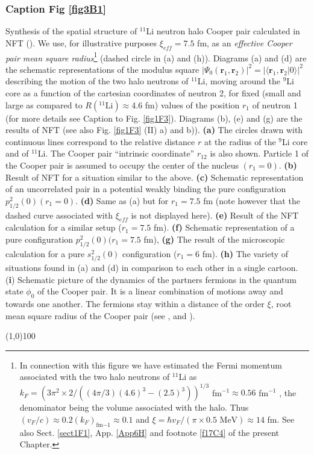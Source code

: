 \subsubsection{Caption Fig \ref{fig3B1}}
         Synthesis of the spatial structure of $^{11}$Li neutron halo Cooper pair calculated in NFT (\cite{Barranco:01}). We use, for illustrative purposes $\xi_{eff}=7.5$ fm, as an \textit{effective Cooper pair mean square radius}\footnote{In connection with this figure we have estimated the Fermi momentum associated with the two
halo neutrons of $^{11}$Li as $k_F= (3\pi^2 \times 2/((4\pi/3)(4.6)^3- (2.5)^3))^{1/3}$ fm$^{-1} \approx 0.56$ fm$^{-1}$ , the denominator
being the volume associated with the halo. Thus $(v_F/c)\approx0.2(k_F)_{\text{fm}{-1}}\approx 0.1$ and $\xi =\hbar v_F /(\pi \times
0.5 \text{ MeV}) \approx 14$ fm. See also Sect. \ref{sect1F1},  App. \ref{App6H} and footnote \ref{f17C4} of the present  Chapter.} (dashed circle in (a) and (h)). Diagrams (a) and (d) are the schematic representations of the modulus square $|\Psi_0(\mathbf r_1, \mathbf r_2)|^2=|\langle\mathbf r_1, \mathbf r_2|0\rangle|^2$ describing the motion of the two halo neutrons of $^{11}$Li, moving around the $^{9}$Li core as a function of the cartesian coordinates of neutron 2, for fixed (small and large as compared to $R(^{11}\text{Li})\approx$4.6 fm) values of the position $r_1$ of neutron 1 (for more details see Caption to Fig. \ref{fig1F3}). Diagrams (b), (e) and (g) are the results of NFT (see also Fig. \ref{fig1F3} (II) a) and b)). \textbf{(a)} The  circles drawn with continuous lines correspond to the relative distance $r$ at the radius of the $^{9}$Li core and of $^{11}$Li. The Cooper pair ``intrinsic coordinate'' $r_{12}$ is also shown. Particle 1 of the Cooper pair is assumed to occupy the center of the nucleus $(r_1=0)$. \textbf{(b)} Result of NFT for a situation similar to the above. \textbf{(c)} Schematic representation of an uncorrelated pair in a potential weakly binding the pure configuration $p^2_{1/2}(0) (r_1=0)$. \textbf{(d)} Same as (a) but for $r_1=7.5$ fm (note however that the dashed curve associated with $\xi_{eff}$ is not displayed here). \textbf{(e)} Result of the NFT calculation for a similar setup ($r_1=7.5$ fm). \textbf{(f)} Schematic representation of a pure configuration $p^2_{1/2}(0) (r_1=7.5$ fm), \textbf{(g)} The result of the microscopic calculation for a  pure $s^2_{1/2}(0)$ configuration ($r_1=6$ fm). \textbf{(h)} The variety of situations found in (a) and (d) in comparison to each other in a single cartoon. (\textbf{i}) Schematic picture of the dynamics of the partners fermions in the quantum state $\phi_0$ of the Cooper pair. It is a linear combination of motions away and towards one another. The fermions stay within a distance of the order $\xi$, root mean square radius of the Cooper pair (see \cite{Weisskopf:81}, \cite{Kadin:07} and \cite{VanWitsen:14}).
\begin{center}
	\line(1,0){100}
\end{center}
         
